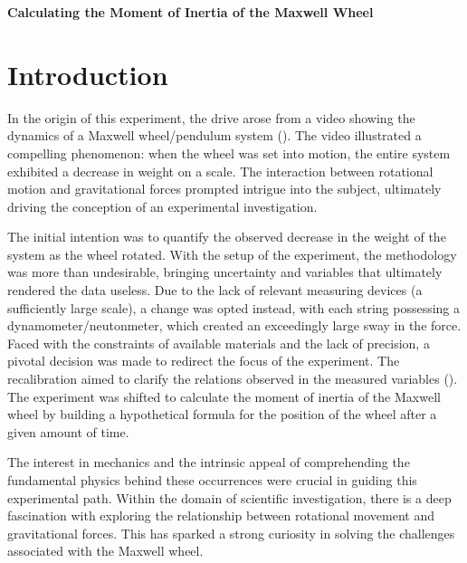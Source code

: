 \documentclass{article}
\begin{document}
\pagestyle{fancy}
\fancyhead[R]{}
\fancyhead[C]{}
\renewcommand{\headrulewidth}{0.4pt}
\renewcommand{\footrulewidth}{2pt}


\begin{center}
    \LARGE{\textbf{Calculating the Moment of Inertia of the Maxwell Wheel}}
\end{center}
\section*{Introduction}
In the origin of this experiment, the drive arose from a video showing the dynamics of a Maxwell wheel/pendulum system (\cite{youtubevid}). The video illustrated a compelling phenomenon: when the wheel was set into motion, the entire system exhibited a decrease in weight on a scale. The interaction between rotational motion and gravitational forces prompted intrigue into the subject, ultimately driving the conception of an experimental investigation.

The initial intention was to quantify the observed decrease in the weight of the system as the wheel rotated. With the setup of the experiment, the methodology was more than undesirable, bringing uncertainty and variables that ultimately rendered the data useless. Due to the lack of relevant measuring devices (a sufficiently large scale), a change was opted instead, with each string possessing a dynamometer/neutonmeter, which created an exceedingly large sway in the force. Faced with the constraints of available materials and the lack of precision, a pivotal decision was made to redirect the focus of the experiment. The recalibration aimed to clarify the relations observed in the measured variables (\cite{MaxwelsWheel_experiment}). The experiment was shifted to calculate the moment of inertia of the Maxwell wheel by building a hypothetical formula for the position of the wheel after a given amount of time.

The interest in mechanics and the intrinsic appeal of comprehending the fundamental physics behind these occurrences were crucial in guiding this experimental path. Within the domain of scientific investigation, there is a deep fascination with exploring the relationship between rotational movement and gravitational forces. This has sparked a strong curiosity in solving the challenges associated with the Maxwell wheel.
\end{document}
